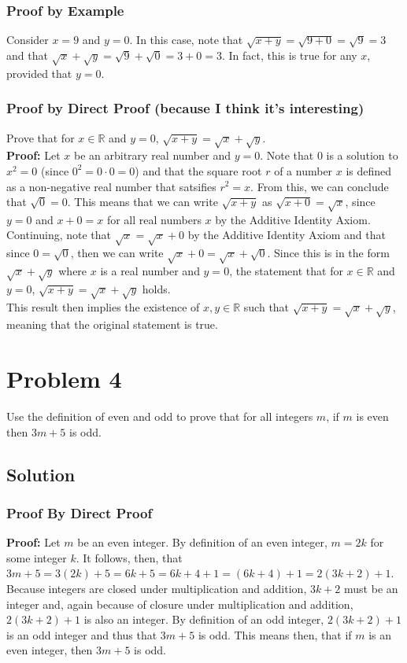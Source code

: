 \documentclass[table]{article}
\begin{document}
\subsubsection{Proof by Example}
Consider $x=9$ and $y=0$. In this case, note that $\sqrt{x+y} = \sqrt{9+0} = \sqrt{9} = 3$ and that $\sqrt{x} + \sqrt{y}= \sqrt{9} + \sqrt{0} = 3 + 0 = 3$. In fact, this is true for any $x$, provided that $y=0$.
\subsubsection{Proof by Direct Proof (because I think it's interesting)}
Prove that for $x \in \mathbb{R}$ and $y=0$, $\sqrt{x + y} = \sqrt{x} + \sqrt{y}$.\\
\textbf{Proof:} Let $x$ be an arbitrary real number and $y=0$. Note that  $0$ is a solution to $x^2=0$ (since $0^2=0\cdot0=0$) and that the square root $r$ of a number $x$ is defined as a non-negative real number that satsifies $r^2=x$. From this, we can conclude that $\sqrt{0}=0$. This means that we can write $\sqrt{x+y}$ as $\sqrt{x+0}=\sqrt{x}$, since $y=0$ and $x+0=x$ for all real numbers $x$ by the Additive Identity Axiom. Continuing, note that $\sqrt{x} = \sqrt{x} + 0$ by the Additive Identity Axiom and that since $0=\sqrt{0}$, then we can write $\sqrt{x}+0=\sqrt{x}+\sqrt{0}$. Since this is in the form $\sqrt{x} + \sqrt{y}$ where $x$ is a real number and $y=0$, the statement that for $x \in \mathbb{R}$ and $y=0$, $\sqrt{x + y} = \sqrt{x} + \sqrt{y}$ holds.\\
This result then implies the existence of $x,y \in \mathbb{R}$ such that $\sqrt{x + y} = \sqrt{x} + \sqrt{y}$, meaning that the original statement is true.
\section{Problem 4}
Use the definition of even and odd to prove that for all integers $m$, if $m$ is even then $3m + 5$
is odd.
\subsection{Solution}
\subsubsection{Proof By Direct Proof}
\textbf{Proof:} Let $m$ be an even integer. By definition of an even integer, $m=2k$ for some integer $k$. It follows, then, that $3m + 5 = 3(2k) + 5 = 6k + 5 = 6k + 4 + 1 = (6k + 4) + 1 = 2(3k + 2) + 1$. Because integers are closed under multiplication and addition, $3k + 2$ must be an integer and, again because of closure under multiplication and addition, $2(3k+2)+1$ is also an integer. By definition of an odd integer, $2(3k+2) + 1$ is an odd integer and thus that $3m + 5$ is odd. This means then, that if $m$ is an even integer, then $3m + 5$ is odd.
\end{document}

